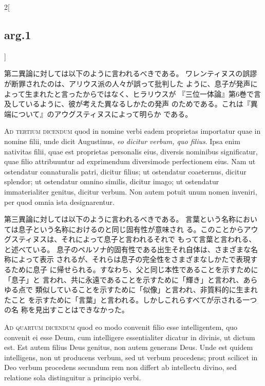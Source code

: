 \documentclass[paper=a4paper,fontsize=10pt,jafontsize=9pt,titlepage]{jlreq}
\begin{document}
\begin{paracol}{2}[\subsection{arg.1}]
\switchcolumn

第二異論に対しては以下のように言われるべきである。
ワレンティヌスの誤謬が断罪されたのは、アリウス派の人々が誤って批判した
 ように、息子が発声によって生まれたと言ったからではなく、ヒラリウスが
 『三位一体論』第6巻で言及しているように、彼が考えた異なるしかたの発声
 のためである。これは『異端について』のアウグスティヌスによって明らか
 である。

\switchcolumn*[\subsection{ad.3}]

{\scshape Ad tertium dicendum} quod in nomine verbi eadem proprietas importatur
quae in nomine filii, unde dicit Augustinus, {\itshape eo dicitur verbum, quo
filius}. Ipsa enim nativitas filii, quae est proprietas personalis
eius, diversis nominibus significatur, quae filio attribuuntur ad
exprimendum diversimode perfectionem eius. Nam ut ostendatur
connaturalis patri, dicitur filius; ut ostendatur coaeternus, dicitur
splendor; ut ostendatur omnino similis, dicitur imago; ut ostendatur
immaterialiter genitus, dicitur verbum. Non autem potuit unum nomen
inveniri, per quod omnia ista designarentur.

\switchcolumn

第三異論に対しては以下のように言われるべきである。
言葉という名称においては息子という名称におけるのと同じ固有性が意味され
 る。このことからアウグスティヌスは、それによって息子と言われるそれで
 もって言葉と言われる、と述べている。
息子のペルソナ的固有性である出生それ自体は、さまざまな名称によって表示
 されるが、それらは息子の完全性をさまざまなしかたで表現するために息子
 に帰せられる。すなわち、父と同じ本性であることを示すために「息子」と
 言われ、共に永遠であることを示すために「輝き」と言われ、あらゆる点で
 類似していることを示すために「似像」と言われ、非質料的に生まれたこと
 を示すために「言葉」と言われる。しかしこれらすべてが示される一つの名
 称を見出すことはできなかった。

\switchcolumn*[\subsection{ad.4}]

{\scshape Ad quartum dicendum} quod eo modo convenit filio esse intelligentem,
quo convenit ei esse Deum, cum intelligere essentialiter dicatur in
divinis, ut dictum est. Est autem filius Deus genitus, non autem
generans Deus. Unde est quidem intelligens, non ut producens verbum,
sed ut verbum procedens; prout scilicet in Deo verbum procedens
secundum rem non differt ab intellectu divino, sed relatione sola
distinguitur a principio verbi.


\end{paracol}
\end{document}
